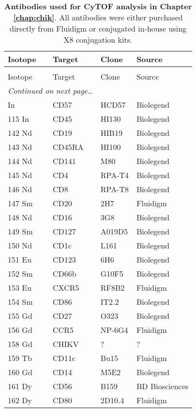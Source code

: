\begin{flushleft}
\newpage

\begin{longtable}[c]{l l l l}
    \toprule
    Isotope & Target & Clone & Source \\
    \midrule
  \endhead
    \caption[Antibodies used for CyTOF analysis in Chapter \ref{chap:chik}]{
      \textbf{Antibodies used for CyTOF analysis in Chapter \ref{chap:chik}}. All antibodies were either purchased directly from Fluidigm or conjugated in-house using X8 conjugation kits. 
    }
    \\
    \toprule
    Isotope & Target & Clone & Source \\
    \midrule
  \endfirsthead
    \midrule
    \multicolumn{2}{r}{\textit{Continued on next page\ldots}} \\
  \endfoot
    \bottomrule
  \endlastfoot
    113 In & CD57 & HCD57 & Biolegend \\
    115 In & CD45 & HI130 & Biolegend \\
    142 Nd & CD19 & HIB19 & Biolegend \\
    143 Nd & CD45RA & HI100 & Biolegend \\
    144 Nd & CD141 & M80 & Biolegend \\
    145 Nd & CD4 & RPA-T4 & Biolegend \\
    146 Nd & CD8 & RPA-T8 & Biolegend \\
    147 Sm & CD20 & 2H7 & Fluidigm \\
    148 Nd & CD16 & 3G8 & Biolegend \\
    149 Sm & CD127 & A019D5 & Biolegend \\
    150 Nd & CD1c & L161 & Biolegend \\
    151 Eu & CD123 & 6H6 & Biolegend \\
    152 Sm & CD66b & G10F5 & Biolegend \\
    153 Eu & CXCR5 & RF8B2 & Fluidigm \\
    154 Sm & CD86 & IT2.2 & Biolegend \\
    155 Gd & CD27 & O323 & Biolegend \\
    156 Gd & CCR5 & NP-6G4 & Fluidigm \\
    158 Gd & CHIKV & ? & ? \\
    159 Tb & CD11c & Bu15 & Fluidigm \\
    160 Gd & CD14 & M5E2 & Biolegend \\
    161 Dy & CD56 & B159 & BD Biosciences \\
    162 Dy & CD80 & 2D10.4 & Fluidigm \\

\end{longtable}
\end{flushleft}
